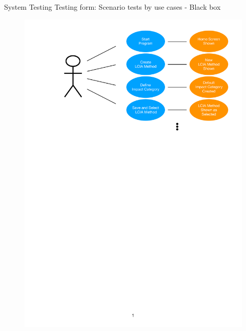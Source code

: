 \begin{frame}{System Testing}
    Testing form: Scenario tests by use cases - Black box
    \vspace{5mm}
    \begin{figure}
        \centering
        \includegraphics[width=0.7\linewidth]{.figures/ScenarioTesting.pdf}
    \end{figure}
\end{frame}